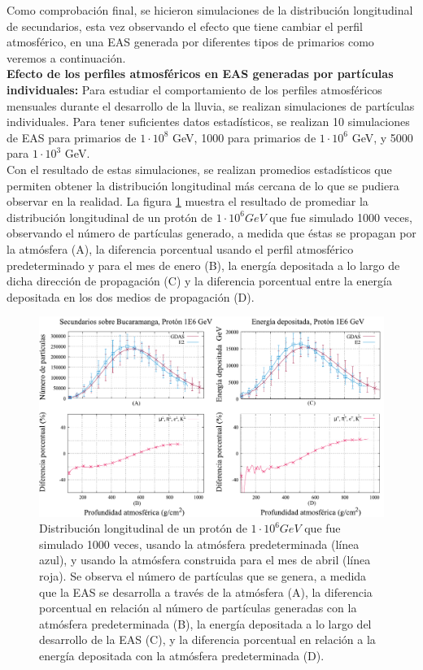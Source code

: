 Como comprobación final, se hicieron simulaciones de la distribución longitudinal de secundarios, esta vez observando el efecto que tiene cambiar el perfil atmosférico, en una EAS generada por diferentes tipos de primarios como veremos a continuación.\\

\textbf{Efecto de los perfiles atmosféricos en EAS generadas por partículas individuales:} Para estudiar el comportamiento de los perfiles atmosféricos mensuales durante el desarrollo de la lluvia, se realizan simulaciones de partículas individuales. Para tener suficientes datos estadísticos, se realizan  10 simulaciones de EAS para primarios de $1\cdot 10^{8}$ GeV, 1000 para primarios de $1\cdot 10^{6}$ GeV, y 5000 para $1\cdot 10^{3}$ GeV.\\

Con el resultado de estas simulaciones, se realizan promedios estadísticos que permiten obtener la distribución longitudinal más cercana de lo que se pudiera observar en la realidad.  La figura \ref{fig:fig23} muestra el resultado de promediar la distribución longitudinal de un protón de $1\cdot 10^{6} GeV$ que fue simulado 1000 veces, observando el número de partículas  generado, a medida que éstas se propagan por la atmósfera (A),  la diferencia porcentual usando el perfil atmosférico predeterminado y para el mes de enero (B), la energía depositada a lo largo de dicha dirección de propagación (C) y la diferencia porcentual entre la energía depositada en los dos medios de propagación (D).\\

\begin{figure}[htb!]
\centering
\includegraphics[width=1\textwidth]{Figs/proton_1E6.pdf}
\caption[Distribución longitudinal de un protón de $1\cdot 10^{6} GeV$.]{Distribución longitudinal de un protón de $1\cdot 10^{6} GeV$ que fue simulado 1000 veces, usando la atmósfera predeterminada (línea azul), y usando la atmósfera construida para el mes de abril (línea roja). Se observa el número de partículas que se genera, a medida que la EAS se desarrolla a través de la atmósfera (A), la diferencia porcentual en relación al número de partículas generadas con la atmósfera predeterminada (B), la energía depositada a lo largo del desarrollo de la EAS (C), y la diferencia porcentual en relación a la energía depositada con la atmósfera predeterminada (D).}
\label{fig:fig23}
\end{figure}

